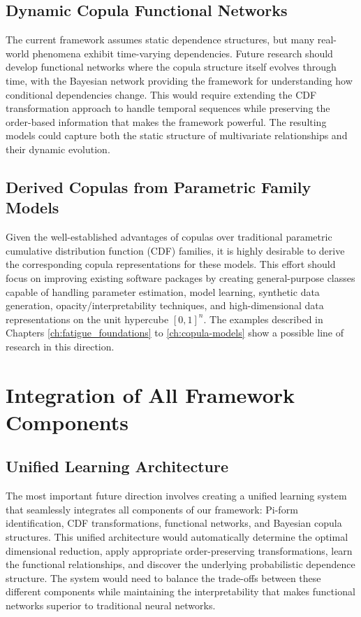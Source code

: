 \subsection{Dynamic Copula Functional Networks}
The current framework assumes static dependence structures, but many real-world phenomena exhibit time-varying dependencies. Future research should develop functional networks where the copula structure itself evolves through time, with the Bayesian network providing the framework for understanding how conditional dependencies change.
This would require extending the CDF transformation approach to handle temporal sequences while preserving the order-based information that makes the framework powerful. The resulting models could capture both the static structure of multivariate relationships and their dynamic evolution.

\subsection{Derived Copulas from Parametric Family Models}

Given the well-established advantages of copulas over traditional parametric cumulative distribution function (CDF) families, it is highly desirable to derive the corresponding copula representations for these models. This effort should focus on improving existing software packages by creating general-purpose classes capable of handling parameter estimation, model learning, synthetic data generation, opacity/interpretability techniques, and high-dimensional data representations on the unit hypercube $[0,1]^n$. The examples described in Chapters \ref{ch:fatigue_foundations} to \ref{ch:copula-models} show a possible line of research in this direction.

\section{Integration of All Framework Components}
\subsection{Unified Learning Architecture}
The most important future direction involves creating a unified learning system that seamlessly integrates all components of our framework: Pi-form identification, CDF transformations, functional networks, and Bayesian copula structures.
This unified architecture would automatically determine the optimal dimensional reduction, apply appropriate order-preserving transformations, learn the functional relationships, and discover the underlying probabilistic dependence structure. The system would need to balance the trade-offs between these different components while maintaining the interpretability that makes functional networks superior to traditional neural networks.


